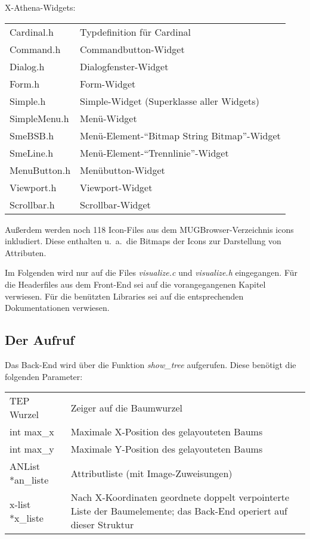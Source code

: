 X-Athena-Widgets:

\bigskip
\begin{tabular}{|l|l|}
\hline
Cardinal.h    &  Typdefinition f\"ur Cardinal   \\
Command.h     &  Commandbutton-Widget           \\
Dialog.h      &  Dialogfenster-Widget          \\
Form.h        &  Form-Widget                     \\
Simple.h      &  Simple-Widget (Superklasse aller Widgets)  \\
SimpleMenu.h  &  Men\"u-Widget                            \\
SmeBSB.h      &  Men\"u-Element-"`Bitmap String Bitmap"'-Widget\\
SmeLine.h     &  Men\"u-Element-"`Trennlinie"'-Widget    \\
MenuButton.h  &  Men\"ubutton-Widget     \\
Viewport.h    &  Viewport-Widget   \\
Scrollbar.h   &  Scrollbar-Widget  \\
\hline
\end{tabular}
\bigskip

Au\ss{}erdem werden noch 118 Icon-Files aus dem MUGBrowser-Verzeichnis icons inkludiert. Diese enthalten u.~a.\ die Bitmaps der Icons zur Darstellung von Attributen.

Im Folgenden wird nur auf die Files {\it visualize.c} und {\it visualize.h} eingegangen. F\"ur die Headerfiles aus dem Front-End sei auf die
vorangegangenen Kapitel verwiesen. F\"ur die ben\"utzten Libraries sei auf die entsprechenden Dokumentationen verwiesen.

\subsection{Der Aufruf}

Das Back-End wird \"uber die Funktion {\it show\_tree} aufgerufen. Diese ben\"otigt die folgenden Parameter:

\bigskip
\begin{tabular}{|l|p{9.2cm}|}
\hline
TEP Wurzel           &   Zeiger auf die Baumwurzel   \\
int max\_x           &   Maximale X-Position des gelayouteten Baums  \\
int max\_y           &   Maximale Y-Position des gelayouteten Baums  \\
ANList *an\_liste    &   Attributliste (mit Image-Zuweisungen)       \\
x-list *x\_liste     &   Nach X-Koordinaten geordnete doppelt verpointerte Liste der Baumelemente; das Back-End operiert auf dieser Struktur   \\
\hline
\end{tabular}
\bigskip

